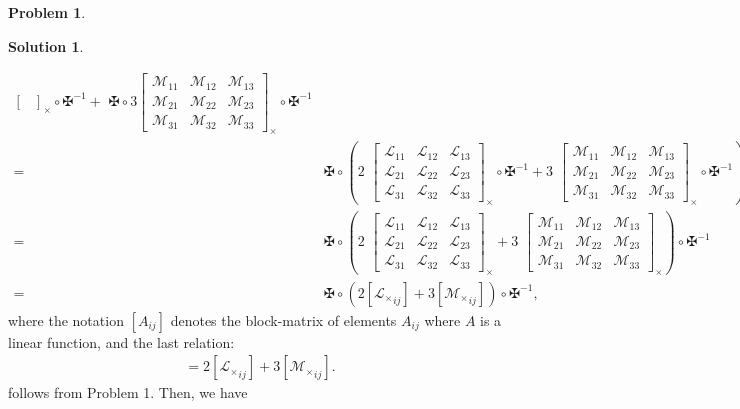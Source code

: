 \documentclass{article}
\theoremstyle{definition}
\newtheorem*{prob*}{Problem}
\newtheorem*{sln*}{Solution}
\newcommand{\lag}{\mathcal{L}}
\newcommand{\M}{\mathcal{M}}
\begin{document}
\begin{prob*}
\begin{sln*}
\begin{enumerate}
\begin{enumerate}
\begin{align*}
\begin{bmatrix}
				\end{bmatrix}_\times \circ \maltese^{-1}
				+ 
				\,\,\maltese\circ 3\begin{bmatrix}
				\M_{11} & \M_{12} & \M_{13}\\
				\M_{21} & \M_{22} & \M_{23}\\
				\M_{31} & \M_{32} & \M_{33}
				\end{bmatrix}_\times \circ \maltese^{-1} \\
				=\,\,
				&\maltese \circ \left(
				2\,\, \begin{bmatrix}
				\lag_{11} & \lag_{12} & \lag_{13}\\
				\lag_{21} & \lag_{22} & \lag_{23}\\
				\lag_{31} & \lag_{32} & \lag_{33}
				\end{bmatrix}_\times \circ \maltese^{-1}
				+
				3\,\, \begin{bmatrix}
				\M_{11} & \M_{12} & \M_{13}\\
				\M_{21} & \M_{22} & \M_{23}\\
				\M_{31} & \M_{32} & \M_{33}
				\end{bmatrix}_\times \circ \maltese^{-1}
				\right)\\
				=\,\,
				&\maltese \circ \left(
				2\,\, \begin{bmatrix}
				\lag_{11} & \lag_{12} & \lag_{13}\\
				\lag_{21} & \lag_{22} & \lag_{23}\\
				\lag_{31} & \lag_{32} & \lag_{33}
				\end{bmatrix}_\times
				+
				3\,\, \begin{bmatrix}
				\M_{11} & \M_{12} & \M_{13}\\
				\M_{21} & \M_{22} & \M_{23}\\
				\M_{31} & \M_{32} & \M_{33}
				\end{bmatrix}_\times
				\right) \circ \maltese^{-1}\\
				=\,\, &\maltese\circ \left( 2[{\lag_\times}_{ij} ] + 3[{\M_\times}_{ij} ]  \right) \circ \maltese^{-1},
				\end{align*}
				where the notation $[A_{ij}]$ denotes the block-matrix of elements $A_{ij}$ where $A$ is a linear function, and the last relation:
				\begin{align*}
				[(2\lag_\times + 3\M_\times)_{ij}] = 2[{\lag_\times}_{ij}] + 3[{\M_\times}_{ij}].
				\end{align*}
				follows from Problem 1. Then, we have
				\begin{align*}

\end{align*}
\end{enumerate}
\end{enumerate}
\end{sln*}
\end{prob*}
\end{document}
